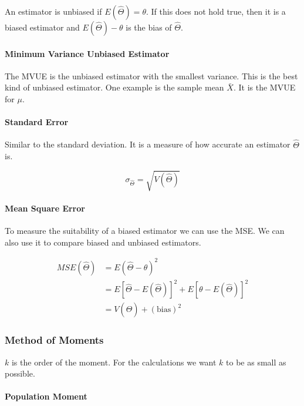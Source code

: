 \documentclass[a4paper, 10pt]{article}
\begin{document}
	An estimator is unbiased if \(E(\hat{\Theta})=\theta\). If this does not hold true, then it is a biased estimator and \(E(\hat{\Theta})-\theta \) is the bias of \(\hat{\Theta}\).

	\paragraph{Minimum Variance Unbiased Estimator}

	The MVUE is the unbiased estimator with the smallest variance. This is the best kind of unbiased estimator. One example is the sample mean \(\bar{X}\). It is the MVUE for \(\mu\).

	\paragraph{Standard Error}

	Similar to the standard deviation. It is a measure of how accurate an estimator \(\hat{\Theta}\) is.

	\begin{equation*}
		\sigma_{\hat{\Theta}}=\sqrt{V(\hat{\Theta})}
	\end{equation*}

	\paragraph{Mean Square Error}

	To measure the suitability of a biased estimator we can use the MSE. We can also use it to compare biased and unbiased estimators.

	\begin{align*}
		MSE(\hat{\Theta}) &= E(\hat{\Theta} - \theta)^2 \\
		&= E\left[\hat{\Theta} - E(\hat{\Theta}) \right] ^2 + E\left[\theta - E(\hat{\Theta}) \right] ^2 \\
		&= V(\hat{\Theta}) + (\mathrm{bias})^2
	\end{align*}

	\subsubsection{Method of Moments}

	\(k\) is the order of the moment. For the calculations we want \(k\) to be as small as possible.

	\paragraph{Population Moment}
\end{document}
